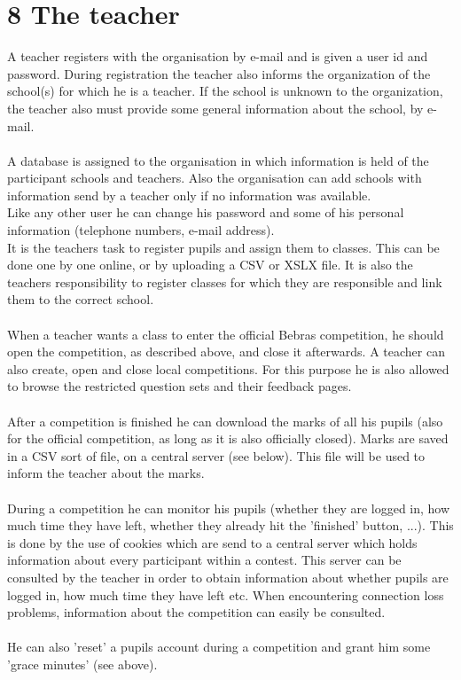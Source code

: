 \section*{8 The teacher}

A teacher registers with the organisation by e-mail and is given a user id and password. During
registration the teacher also informs the organization of the school(s) for which he is a teacher. If the school is unknown to the organization, the teacher also must provide some general information about the school, by e-mail. \\
\\
A database is assigned to the organisation in which information is held of the participant schools and teachers. Also the organisation can add schools with information send by a teacher only if no information was available. \\
Like any other user he can change his password and some of his personal information (telephone numbers, e-mail address).\\
It is the teachers task to register pupils and assign them to classes. This can be done one by one online, or by uploading a CSV or XSLX file. It is also the teachers responsibility to register classes for which they are responsible and link them to the correct school.\\
\\
When a teacher wants a class to enter the official Bebras competition, he should open the competition, as described above, and close it afterwards. A teacher can also create, open and close local competitions. For this purpose he is also allowed to browse the restricted question sets and their feedback pages.\\
\\
After a competition is finished he can download the marks of all his pupils (also for the official competition, as long as it is also officially closed). Marks are saved in a CSV sort of file, on a central server (see below). This file will be used to inform the teacher about the marks.\\
\\
During a competition he can monitor his pupils (whether they are logged in, how much time they have left, whether they already hit the 'finished' button, ...). This is done by the use of cookies which are send to a central server which holds information about every participant within a contest. This server can be consulted by the teacher in order to obtain information about whether pupils are logged in, how much time they have left etc. When encountering connection loss problems, information about the competition can easily be consulted.  \\
\\
He can also 'reset' a pupils account during a competition and grant him some 'grace minutes' (see above).